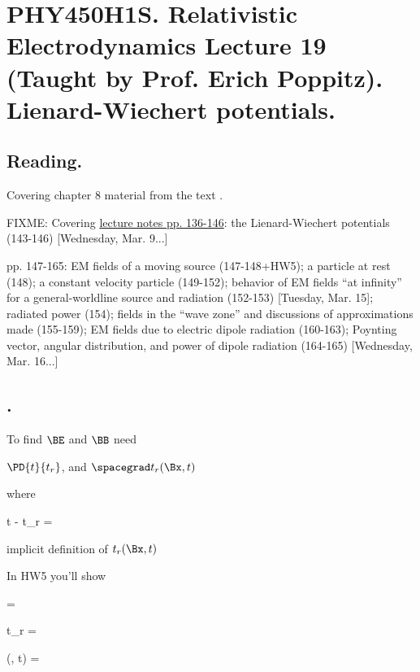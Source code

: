 
%

\chapter{PHY450H1S.  Relativistic Electrodynamics Lecture 19 (Taught by Prof. Erich Poppitz).  Lienard-Wiechert potentials.}
\label{chap:relativisticElectrodynamicsL19}
{}
\date{Mar 15, 2011}

\beginArtNoToc

\section{Reading.}

Covering chapter 8 material from the text \cite{landau1980classical}.

FIXME:
Covering \href{http://www.physics.utoronto.ca/~poppitz/epoppitz/PHY450_files/RelEMpp136-146.pdf}{lecture notes pp. 136-146}: the Lienard-Wiechert potentials (143-146) [Wednesday, Mar. 9...]

pp. 147-165: EM fields of a moving source (147-148+HW5); a particle at rest (148); a constant velocity particle (149-152); behavior of EM fields ``at infinity'' for a general-worldline source and radiation (152-153) [Tuesday, Mar. 15]; radiated power (154); fields in the ``wave zone'' and discussions of approximations made (155-159); EM fields due to electric dipole radiation (160-163); Poynting vector, angular distribution, and power of dipole radiation (164-165) [Wednesday, Mar. 16...]

\section{.}

To find $\BE$ and $\BB$ need 

$\PD{t}{t_r}$, and $\spacegrad t_r(\Bx, t)$

where 

t - t_r = 

implicit definition of $t_r(\Bx, t)$

In HW5 you'll show

 = 

\spacegrad t_r =  

\BE(\Bx, t) 
= 


\EndArticle
